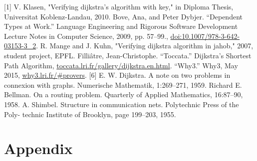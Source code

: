 \documentclass[11pt, a4paper]{article} %
\theoremstyle{definition}
\begin{document}
[1] V. Klasen, "Verifying dijkstra's algorithm with key," in Diploma Thesis, Universitat Koblenz-Landau, 2010.%
\newline
[2] Bove, Ana, and Peter Dybjer. “Dependent Types at Work.” Language Engineering and Rigorous Software Development Lecture Notes in Computer Science, 2009, pp. 57–99., \url{doi:10.1007/978-3-642-03153-3_2}. %
\newline
[3] R. Mange and J. Kuhn, "Verifying dijkstra algorithm in jahob," 2007, student project, EPFL.%
\newline
[4] Filliâtre, Jean-Christophe. “Toccata.” Dijkstra's Shortest Path Algorithm, \url{toccata.lri.fr/gallery/dijkstra.en.html}.%
\newline
[5] “Why3.” Why3, May 2015, \url{why3.lri.fr/#provers}. %
\newline
[6] E. W. Dijkstra. A note on two problems in connexion with graphs. Numerische Mathematik, 1:269–271, 1959.
\newline 
[7] Richard E. Bellman. On a routing problem. Quarterly of Applied Mathematics, 16:87–90, 1958.
\newline
[8] A. Shimbel. Structure in communication nets. Polytechnic Press of the Poly- technic Institute of Brooklyn, page 199–203, 1955.

\newpage %
\section*{Appendix} %


\newpage %
\thispagestyle{empty} %
\end{document}
